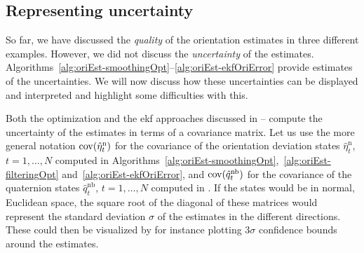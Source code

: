 \subsection{Representing uncertainty}
\label{sec:oriEst-repreUncert}
So far, we have discussed the \emph{quality} of the orientation estimates in three different examples. However, we did not discuss the \emph{uncertainty} of the estimates. Algorithms~\ref{alg:oriEst-smoothingOpt}--\ref{alg:oriEst-ekfOriError} provide estimates of the uncertainties. We will now discuss how these uncertainties can be displayed and interpreted and highlight some difficulties with this. 

Both the optimization and the \gls{ekf} approaches discussed in -- compute the uncertainty of the estimates in terms of a covariance matrix. Let us use the more general notation $\operatorname{cov} ( \hat{\eta}_t^\text{n})$ for the covariance of the orientation deviation states $\hat{\eta}_t^\text{n}$, $t = 1, \hdots, N$ computed in Algorithms~\ref{alg:oriEst-smoothingOpt},~\ref{alg:oriEst-filteringOpt} and~\ref{alg:oriEst-ekfOriError}, and $\operatorname{cov} ( \hat{q}_t^\text{nb})$ for the covariance of the quaternion states $\hat{q}_t^\text{nb}$, $t = 1, \hdots, N$ computed in . If the states would be in normal, Euclidean space, the square root of the diagonal of these matrices would represent the standard deviation $\sigma$ of the estimates in the different directions. These could then be visualized by for instance plotting $3 \sigma$ confidence bounds around the estimates. 

